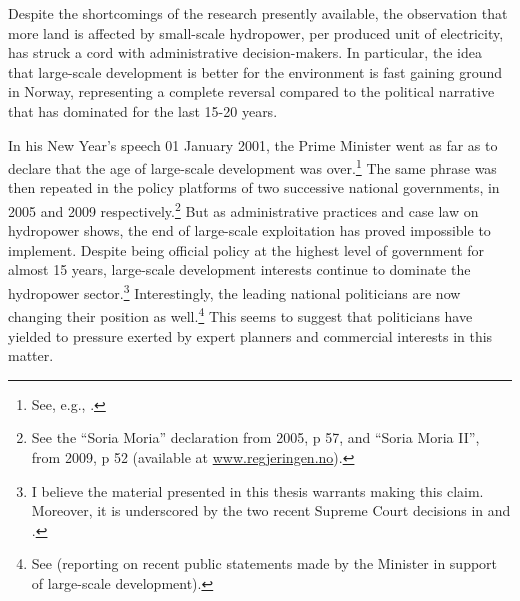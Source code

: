 Despite the shortcomings of the research presently available, the observation that more land is affected by small-scale hydropower, per produced unit of electricity, has struck a cord with administrative decision-makers. In particular, the idea that large-scale development is better for the environment is fast gaining ground in Norway, representing a complete reversal compared to the political narrative that has dominated for the last 15-20 years.

In his New Year's speech 01 January 2001, the Prime Minister went as far as to declare that the age of large-scale development was over.\footnote{See, e.g., \cite[34]{haltbrekken12}.} The same phrase was then repeated in the policy platforms of two successive national governments, in 2005 and 2009 respectively.\footnote{See the ``Soria Moria'' declaration from 2005, p 57, and ``Soria Moria II'', from 2009, p 52 (available at \url{www.regjeringen.no}).} But as administrative practices and case law on hydropower shows, the end of large-scale exploitation has proved impossible to implement. Despite being official policy at the highest level of government for almost 15 years, large-scale development interests continue to dominate the hydropower sector.\footnote{I believe the material presented in this thesis warrants making this claim. Moreover, it is underscored by the two recent Supreme Court decisions in \cite{jorpeland11} and \cite{otra13}.} Interestingly, the leading national politicians are now changing their position as well.\footnote{See \cite{liemin14} (reporting on recent public statements made by the Minister in support of large-scale development).} This seems to suggest that politicians have yielded to pressure exerted by expert planners and commercial interests in this matter.


